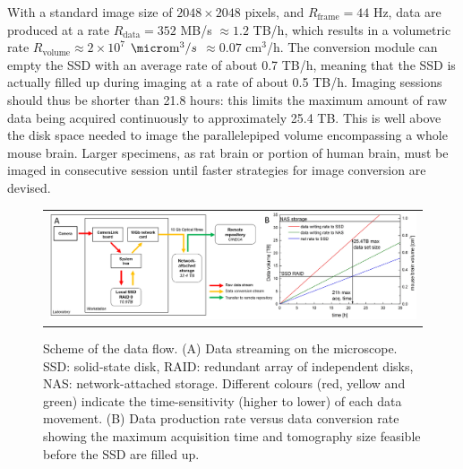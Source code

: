 \documentclass[12pt]{spieman}  %
\begin{document}
With a standard image size of $2048\times 2048$ pixels, and $R_{\text{frame}}=44$ Hz, data are produced at a rate $R_{\text{data}}=352$ MB/s $\approx 1.2$ TB/h, which results in a volumetric rate $R_{\text{volume}} \approx 2\times 10^7$ $\micro\text{m}^3/s$ $\approx 0.07$ $\text{cm}^3$/h. The conversion module can empty the SSD with an average rate of about 0.7 TB/h, meaning that the SSD is actually filled up during imaging at a rate of about 0.5 TB/h. Imaging sessions should thus be shorter than 21.8 hours: this limits the maximum amount of raw data being acquired continuously to approximately 25.4 TB. This is well above the disk space needed to image the parallelepiped volume encompassing a whole mouse brain. Larger specimens, as rat brain or portion of human brain, must be imaged in consecutive session until faster strategies for image conversion are devised.

	\begin{figure}
   \begin{center}
   \begin{tabular}{c}
   \includegraphics[width=\textwidth]{DataFlow.eps}
   \end{tabular}
   \end{center}
   \caption{\label{fig:DataFlow} Scheme of the data flow. (A) Data streaming on the microscope. SSD: solid-state disk, RAID: redundant array of independent disks, NAS: network-attached storage. Different colours (red, yellow and green) indicate the time-sensitivity (higher to lower) of each data movement. (B) Data production rate versus data conversion rate showing the maximum acquisition time and tomography size feasible before the SSD are filled up.} 
   \end{figure}
\end{document}
